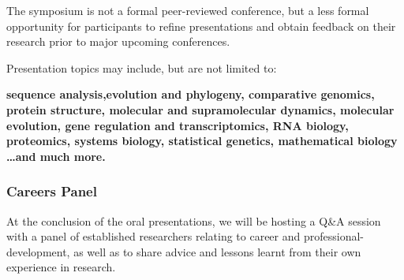 \documentclass[10pt,]{article}
\begin{document}
The symposium is not a formal peer-reviewed conference, but a less formal
opportunity for participants to refine presentations and obtain feedback on
their research prior to major upcoming conferences.

Presentation topics may include, but are not limited to:\par

\begin{minipage}[c]{\linewidth}
    \centering
    \begin{varwidth}[c]{\linewidth}
        \raggedright
        \bfseries
        sequence analysis,evolution and phylogeny, comparative genomics, protein
        structure, molecular and supramolecular dynamics, molecular evolution, gene
        regulation and transcriptomics, RNA biology, proteomics, systems biology,
        statistical genetics, mathematical biology \normalfont\ldots and much more.
        \end{varwidth}
\end{minipage}\par\bigskip



\subsubsection{Careers Panel}

At the conclusion of the oral presentations, we will be hosting a Q\&A
session with a panel of established researchers
relating to career and professional-development, as well as to share
advice and lessons learnt from their own experience in research.
\end{document}
